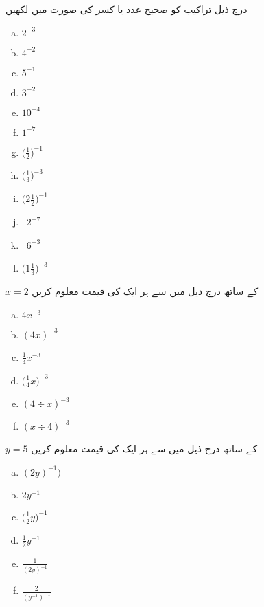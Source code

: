 درج ذیل تراکیب کو صحیح عدد یا کسر کی صورت میں لکھیں
\begin{multicols}{4}
\begin{enumerate}[a.]
\item
\(2^{-3}\)
\item
\(4^{-2}\)
\item
\(5^{-1}\)
\item
\(3^{-2}\)
\item
\(10^{-4}\)
\item
\(1^{-7}\)
\item
\(\big(\frac{1}{2}\big)^{-1}\)
\item
\(\big(\frac{1}{3}\big)^{-3}\)
\item
\(\big(2\frac{1}{2}\big)^{-1}\)
\item\
\(2^{-7}\)
\item\
\(6^{-3}\)
\item
\(\big(1\frac{1}{3}\big)^{-3}\)
\end{enumerate}
\end{multicols}

\(x=2\) کے ساتھ درج ذیل میں سے ہر ایک کی قیمت معلوم کریں
\begin{multicols}{3}
\begin{enumerate}[a.]
\item
\(4x^{-3}\)
\item
\((4x)^{-3}\)
\item
\(\frac{1}{4}x^{-3}\)
\item
\(\big(\frac{1}{4}x\big)^{-3}\)
\item
\((4\div x)^{-3}\)
\item
\((x\div 4)^{-3}\)
\end{enumerate}
\end{multicols}
\(y=5\) کے ساتھ درج ذیل میں سے ہر ایک کی قیمت معلوم کریں
\begin{multicols}{3}
\begin{enumerate}[a.]
\item
\((2y)^{-1})\)
\item
\(2y^{-1}\)
\item
\(\big(\frac{1}{2}y\big)^{-1}\)
\item
\(\frac{1}{2}y^{-1}\)
\item
\(\frac{1}{(2y)^{-1}}\)
\item
\(\frac{2}{(y^{-1})^{-1}}\)
\end{enumerate}
\end{multicols}


